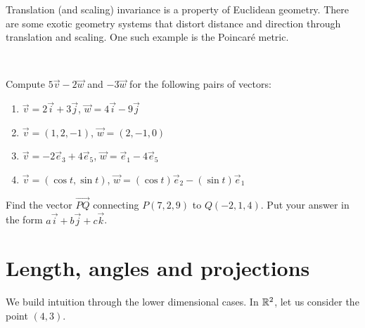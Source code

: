 \begin{remark}
	Translation (and scaling) invariance is a property of Euclidean geometry. There are some exotic geometry systems that distort distance and direction through translation and scaling. One such example is the Poincar\'e metric.
\end{remark}
%
\ \\
\exercises
\begin{exerciselist}
	\item Compute $5\vec{v}-2\vec{w}$ and $-3\vec{w}$ for the following pairs of vectors: \begin{enumerate}[label=(\alph*)]
		\item $\vec{v}=2\vec{i}+3\vec{j}$, $\vec{w}=4\vec{i}-9\vec{j}$
		\item $\vec{v}=(1,2,-1)$, $\vec{w}=(2,-1,0)$
		\item $\vec{v}=-2\vec{e}_3+4\vec{e}_5$, $\vec{w}=\vec{e}_1 -4\vec{e}_5$
		\item $\vec{v}=(\cos t, \sin t)$, $\vec{w}=(\cos t)\vec{e}_2 - (\sin t) \vec{e}_1$
	\end{enumerate}
	\item Find the vector $\overrightarrow{PQ}$ connecting $P(7,2,9)$ to $Q(-2,1,4)$. Put your answer in the form $a\vec{i}+b\vec{j}+c\vec{k}$.
\end{exerciselist}
\section{Length, angles and projections}
We build intuition through the lower dimensional cases.
In $\mathbb{R}^2$, let us consider the point $(4,3)$.\\
\begin{figure}
\end{figure}

